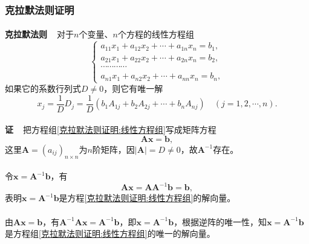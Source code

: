 \subsubsection{克拉默法则证明}
\paragraph{}
\textbf{克拉默法则~~}对于$n$个变量、$n$个方程的线性方程组
\begin{equation}
  \label{克拉默法则证明:线性方程组}
  \left\{\begin{array}{l}
    a_{11}x_1 + a_{12}x_2 + \cdots + a_{1n}x_n = b_1, \\
    a_{21}x_1 + a_{22}x_2 + \cdots + a_{2n}x_n = b_2, \\
    \cdots\cdots\cdots\cdots \\
    a_{n1}x_1 + a_{n2}x_2 + \cdots + a_{nn}x_n = b_n,
  \end{array} \right.
\end{equation}
如果它的系数行列式$D\neq 0$，则它有唯一解
\begin{equation*}
  x_j = \frac{1}{D}D_j = \frac{1}{D}(b_1A_{1j} + b_2A_{2j} + \cdots + b_nA_{nj}) \quad (j=1,2,\cdots,n).
\end{equation*}

\paragraph{}
\textbf{证~~}把方程组\eqref{克拉默法则证明:线性方程组}写成矩阵方程
\begin{equation*}
  \bm{Ax} = \bm{b},
\end{equation*}
这里$\bm{A}=(a_{ij})_{n\times n}$为$n$阶矩阵，因$|\bm{A}|=D\neq 0$，故$\bm{A}^{-1}$存在。
\paragraph{}
令$\bm{x}=\bm{A}^{-1}\bm{b}$，有
\begin{equation*}
  \bm{Ax} = \bm{AA}^{-1}\bm{b} = \bm{b},
\end{equation*}
表明$\bm{x}=\bm{A}^{-1}\bm{b}$是方程\eqref{克拉默法则证明:线性方程组}的解向量。

\paragraph{}
由$\bm{Ax}=\bm{b}$，有$\bm{A}^{-1}\bm{Ax}=\bm{A}^{-1}\bm{b}$，即$\bm{x}=\bm{A}^{-1}\bm{b}$，根据逆阵的唯一性，知$\bm{x}=\bm{A}^{-1}\bm{b}$是方程组\eqref{克拉默法则证明:线性方程组}的唯一的解向量。

